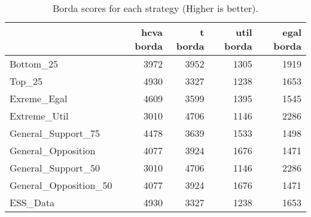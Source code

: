 \begin{table}
\caption{Borda scores for each strategy (Higher is better).}
\begin{tabular}{lrrrr}
\toprule
 & hcva borda & t borda & util borda & egal borda \\
\midrule
Bottom_25 & 3972 & 3952 & 1305 & 1919 \\
Top_25 & 4930 & 3327 & 1238 & 1653 \\
Exreme_Egal & 4609 & 3599 & 1395 & 1545 \\
Extreme_Util & 3010 & 4706 & 1146 & 2286 \\
General_Support_75 & 4478 & 3639 & 1533 & 1498 \\
General_Opposition & 4077 & 3924 & 1676 & 1471 \\
General_Support_50 & 3010 & 4706 & 1146 & 2286 \\
General_Opposition_50 & 4077 & 3924 & 1676 & 1471 \\
ESS_Data & 4930 & 3327 & 1238 & 1653 \\
\bottomrule
\end{tabular}
\end{table}
